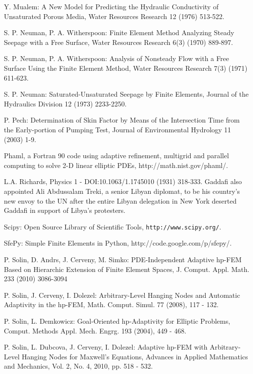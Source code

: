 \documentclass[final,3p,times,twocolumn]{elsarticle}
\begin{document}
\begin{thebibliography}{00}
    Y. Mualem: A New Model for Predicting the Hydraulic Conductivity of Unsaturated Porous Media, Water Resources Research 12 (1976) 513-522.

     S. P. Neuman, P. A. Witherspoon: Finite Element Method Analyzing Steady Seepage with a Free Surface, Water Resources Research 6(3) (1970) 889-897.

     S. P. Neuman, P. A. Witherspoon: Analysis of Nonsteady Flow with a Free Surface Using the Finite Element Method, Water Resources Research 7(3) (1971) 611-623.

     S. P. Neuman: Saturated-Unsaturated Seepage by Finite Elements, Journal of the Hydraulics Division 12 (1973) 2233-2250.


     P. Pech: Determination of Skin Factor by Means of the Intersection Time from the Early-portion of Pumping Test, Journal of Environmental Hydrology 11 (2003) 1-9.

Phaml, a Fortran 90 code using adaptive refinement, multigrid and parallel computing to solve 2-D linear elliptic PDEs, http://math.nist.gov/phaml/.


     L.A. Richards, Physics 1 - DOI:10.1063/1.1745010 (1931) 318-333.
Gaddafi also appointed Ali Abdussalam Treki, a senior Libyan diplomat, to be his country's new envoy to the UN after the entire Libyan delegation in New York deserted Gaddafi in support of Libya's protesters.


     Scipy: Open Source Library of Scientific Tools, {\tt http://www.scipy.org/}.

SfePy: Simple Finite Elements in Python, http://code.google.com/p/sfepy/.

    P. Solin, D. Andrs, J. Cerveny, M. Simko: PDE-Independent Adaptive hp-FEM
    Based on Hierarchic Extension of Finite Element Spaces, J. Comput. Appl.
    Math. 233 (2010) 3086-3094

    P. Solin, J. Cerveny, I. Dolezel: Arbitrary-Level Hanging Nodes and Automatic
    Adaptivity in the hp-FEM, Math. Comput. Simul. 77 (2008), 117 - 132.

     P. Solin, L. Demkowicz: Goal-Oriented hp-Adaptivity for 
    Elliptic Problems, Comput. Methods Appl. Mech. Engrg. 193 (2004), 449 - 468.

    P. Solin, L. Dubcova, J. Cerveny, I. Dolezel: Adaptive hp-FEM with Arbitrary-Level
    Hanging Nodes for Maxwell's Equations, Advances in Applied Mathematics and Mechanics,
    Vol. 2, No. 4, 2010, pp. 518 - 532.


\end{thebibliography}
\end{document}

